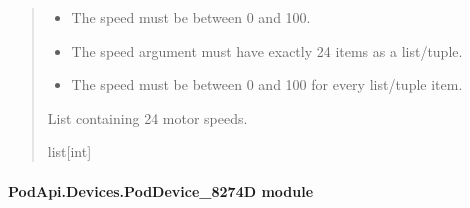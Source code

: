 \documentclass[letterpaper,10pt,english]{sphinxmanual}
\begin{document}
\begin{fulllineitems}
\begin{fulllineitems}
\begin{quote}
\begin{description}
\begin{itemize}
\item {} 
\sphinxAtStartPar
{} \textendash{} The speed must be between 0 and 100.

\item {} 
\sphinxAtStartPar
{} \textendash{} The speed argument must have exactly 24 items as a list/tuple.

\item {} 
\sphinxAtStartPar
{} \textendash{} The speed must be between 0 and 100 for every list/tuple item.

\end{itemize}

\sphinxAtStartPar
List containing 24 motor speeds.

\sphinxAtStartPar
list{[}int{]}

\end{description}\end{quote}

\end{fulllineitems}


\end{fulllineitems}



\paragraph{PodApi.Devices.PodDevice\_8274D module}
\label{\detokenize{PodApi.Devices:module-PodApi.Devices.PodDevice_8274D}}\label{\detokenize{PodApi.Devices:podapi-devices-poddevice-8274d-module}}
\end{document}
